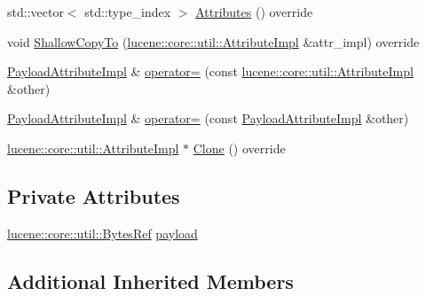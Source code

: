 \begin{DoxyCompactItemize}
\item 
std\+::vector$<$ std\+::type\+\_\+index $>$ \mbox{\hyperlink{classlucene_1_1core_1_1analysis_1_1tokenattributes_1_1PayloadAttributeImpl_a1f7dbb8afdd42ca827dc6e077445071b}{Attributes}} () override
\item 
void \mbox{\hyperlink{classlucene_1_1core_1_1analysis_1_1tokenattributes_1_1PayloadAttributeImpl_ae1104df0b599fd494620e2bce9d39b6c}{Shallow\+Copy\+To}} (\mbox{\hyperlink{classlucene_1_1core_1_1util_1_1AttributeImpl}{lucene\+::core\+::util\+::\+Attribute\+Impl}} \&attr\+\_\+impl) override
\item 
\mbox{\hyperlink{classlucene_1_1core_1_1analysis_1_1tokenattributes_1_1PayloadAttributeImpl}{Payload\+Attribute\+Impl}} \& \mbox{\hyperlink{classlucene_1_1core_1_1analysis_1_1tokenattributes_1_1PayloadAttributeImpl_a82dd546c2275107d47d6a152cd43d04e}{operator=}} (const \mbox{\hyperlink{classlucene_1_1core_1_1util_1_1AttributeImpl}{lucene\+::core\+::util\+::\+Attribute\+Impl}} \&other)
\item 
\mbox{\hyperlink{classlucene_1_1core_1_1analysis_1_1tokenattributes_1_1PayloadAttributeImpl}{Payload\+Attribute\+Impl}} \& \mbox{\hyperlink{classlucene_1_1core_1_1analysis_1_1tokenattributes_1_1PayloadAttributeImpl_ac5a8e038064f6ee8774df0708467201f}{operator=}} (const \mbox{\hyperlink{classlucene_1_1core_1_1analysis_1_1tokenattributes_1_1PayloadAttributeImpl}{Payload\+Attribute\+Impl}} \&other)
\item 
\mbox{\hyperlink{classlucene_1_1core_1_1util_1_1AttributeImpl}{lucene\+::core\+::util\+::\+Attribute\+Impl}} $\ast$ \mbox{\hyperlink{classlucene_1_1core_1_1analysis_1_1tokenattributes_1_1PayloadAttributeImpl_a5ec30ffd50c79e22ba0166b0e47629b3}{Clone}} () override
\end{DoxyCompactItemize}
\subsection*{Private Attributes}
\begin{DoxyCompactItemize}
\item 
\mbox{\hyperlink{classlucene_1_1core_1_1util_1_1BytesRef}{lucene\+::core\+::util\+::\+Bytes\+Ref}} \mbox{\hyperlink{classlucene_1_1core_1_1analysis_1_1tokenattributes_1_1PayloadAttributeImpl_ac5bd28a25a555ffb21b75fda1036def1}{payload}}
\end{DoxyCompactItemize}
\subsection*{Additional Inherited Members}


